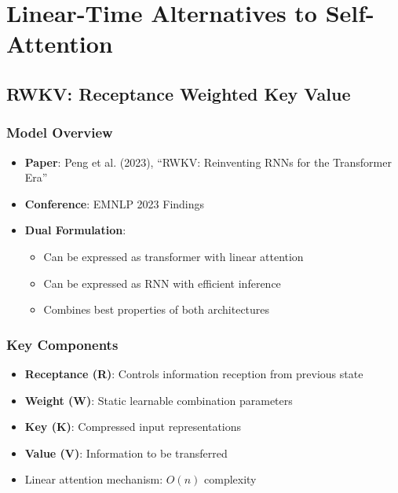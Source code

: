 \documentclass[11pt]{article}
\begin{document}
\section{Linear-Time Alternatives to Self-Attention}

\subsection{RWKV: Receptance Weighted Key Value}

\subsubsection{Model Overview}
\begin{itemize}[leftmargin=*]
    \item \textbf{Paper}: Peng et al. (2023), ``RWKV: Reinventing RNNs for the Transformer Era''~\cite{peng2023rwkv}
    \item \textbf{Conference}: EMNLP 2023 Findings
    \item \textbf{Dual Formulation}:
    \begin{itemize}
        \item Can be expressed as transformer with linear attention
        \item Can be expressed as RNN with efficient inference
        \item Combines best properties of both architectures
    \end{itemize}
\end{itemize}

\subsubsection{Key Components}
\begin{itemize}[leftmargin=*]
    \item \textbf{Receptance (R)}: Controls information reception from previous state
    \item \textbf{Weight (W)}: Static learnable combination parameters
    \item \textbf{Key (K)}: Compressed input representations
    \item \textbf{Value (V)}: Information to be transferred
    \item Linear attention mechanism: $O(n)$ complexity
\end{itemize}
\end{document}

